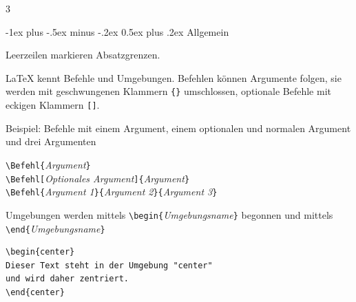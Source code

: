\documentclass[10pt,landscape]{article}
\makeatletter
\renewcommand{\section}{\@startsection{section}{1}{0mm}%
                                {-1ex plus -.5ex minus -.2ex}%
                                {0.5ex plus .2ex}%
                                {\normalfont\large\bfseries}}
\renewcommand{\subsection}{\@startsection{subsection}{2}{0mm}%
                                {-1explus -.5ex minus -.2ex}%
                                {0.5ex plus .2ex}%
                                {\normalfont\normalsize\bfseries}}
\makeatother
\begin{document}
\begin{multicols}{3}
% 
% 
% 

\section{Allgemein}

Leerzeilen markieren Absatzgrenzen.

{\LaTeX} kennt Befehle und Umgebungen. Befehlen können Argumente folgen, sie werden mit
geschwungenen Klammern \verb!{}! umschlossen, optionale
Befehle mit eckigen Klammern \verb![]!.

Beispiel: Befehle mit einem Argument, einem optionalen und normalen Argument und drei Argumenten

\verb!\Befehl{!\textit{Argument}\verb!}!\\
\verb!\Befehl[!\textit{Optionales Argument}\verb!]{!\textit{Argument}\verb!}!\\
\verb!\Befehl{!\textit{Argument 1}\verb!}{!\textit{Argument 2}\verb!}{!\textit{Argument 3}\verb!}!

Umgebungen werden mittels \verb!\begin{!\textit{Umgebungsname}\verb!}! begonnen und mittels \verb!\end{!\textit{Umgebungsname}\verb!}!  

\begin{verbatim}
\begin{center}
Dieser Text steht in der Umgebung "center" 
und wird daher zentriert.
\end{center}
\end{verbatim}


\end{multicols}
\end{document}
